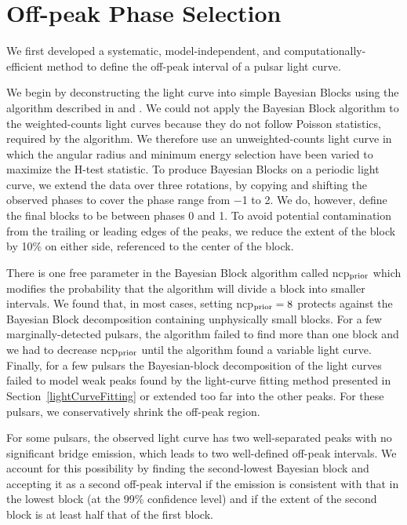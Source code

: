 \section{Off-peak Phase Selection}

We first developed a systematic, model-independent, and computationally-efficient method 
to define the off-peak interval of a pulsar light curve.

We begin by deconstructing the light curve 
into simple Bayesian Blocks using the algorithm described in
\citet{Jackson_Bayesian_Blocks_2003} and \citet{Scargle2013}.  
We could not apply the Bayesian Block algorithm to the weighted-counts
light curves because they do not follow Poisson statistics, required
by the algorithm.
We therefore use an unweighted-counts light curve in which the angular radius and minimum energy selection have been varied to maximize the H-test statistic.  To produce Bayesian Blocks on a periodic light curve,
we extend the data over three rotations, by copying and shifting the
observed phases to cover the phase range from $-$1 to 2.  We do, however,
define the final blocks to be between phases 0 and 1.  
To avoid potential contamination from the trailing or leading edges of
the peaks, we reduce the extent of the block by 10\% on either side,
referenced to the center of the block.

There is one free parameter in the Bayesian Block algorithm called
ncp$\rm _{prior}$ which modifies the probability that the
algorithm will divide a block into smaller intervals.
We found that, in most cases, setting ncp$\rm _{prior}=8$ protects against
the Bayesian Block decomposition containing unphysically small blocks.
For a few marginally-detected pulsars, the algorithm failed 
to find more than one block and we had to decrease ncp$\rm _{prior}$ until the
algorithm found a variable light curve. Finally, for a few pulsars the 
Bayesian-block decomposition of the light curves failed to model 
weak peaks found by the light-curve fitting method
presented in Section~\ref{lightCurveFitting} or extended
too far into the other peaks. For these pulsars,
we conservatively shrink the off-peak region.

For some pulsars, the observed light curve has two well-separated peaks
with no significant bridge emission, which leads to two well-defined
off-peak intervals.  We account for this possibility by finding the second-lowest 
Bayesian block and accepting it as a second off-peak interval if
the emission is consistent with that in the lowest block (at the 99\%
confidence level) and if the extent of the second block is at least half
that of the first block.

